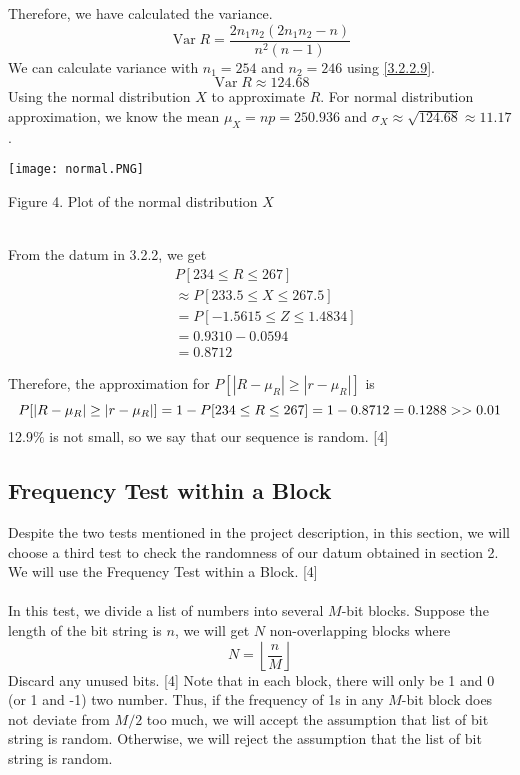 \documentclass[a4paper,12pt]{article}
\begin{document}
Therefore, we have calculated the variance.\\
\begin{equation}\label{3.2.2.9}
\operatorname { Var }  R=\frac { 2 n_1 n_2 ( 2n_1 n_2 - n ) } {  n  ^ { 2 } ( n - 1 ) }
\end{equation}
We can calculate variance with $n_1=254$ and $n_2=246$ using \eqref{3.2.2.9}.\\
\begin{equation*}
\operatorname{Var}  R\approx124.68
\end{equation*}
Using the normal distribution $X$ to approximate $R$. For normal distribution approximation, we know the mean $\mu_X=np=250.936$ and $\sigma_X\approx\sqrt{124.68}\approx11.17$.\\

\centerline{\texttt{[image: normal.PNG]}}

\centerline{Figure 4. Plot of the normal distribution $X$}

\noindent \\ From the datum in 3.2.2, we get
\begin{equation*}
\begin{aligned}
&P[234\leq R \leq 267]\\
& \approx P[233.5 \leq X \leq 267.5]\\
&=P[-1.5615 \leq Z \leq1.4834]\\
&=0.9310-0.0594\\
&=0.8712
\end{aligned}
\end{equation*}

Therefore, the approximation for $P[|R-\mu _R|\geq |r-\mu_R|]$ is
\begin{equation*}
P[|R-\mu _R|\geq |r-\mu_R|]=1-P[234\leq R\leq 267] =1-0.8712=0.1288>>0.01\\
\end{equation*}
12.9$\%$ is not small, so we say that our sequence is random. [4] 
\subsection{Frequency Test within a Block}
\noindent Despite the two tests mentioned in the project description, in this section, we will choose a third test to check the randomness of our datum obtained in section 2. We will use the Frequency Test within a Block. [4] \\\\
In this test, we divide a list of numbers into several $M$-bit blocks. Suppose the length of the bit string is $n$, we will get $N$ non-overlapping blocks where
$$N=\left\lfloor\frac{n}{M}\right\rfloor$$
Discard any unused bits. [4] Note that in each block, there will only be 1 and 0 (or 1 and -1) two number. Thus, if the frequency of 1s in any $M$-bit block does not deviate from $M/2$ too much, we will accept the assumption that list of bit string is random. Otherwise, we will reject the assumption that the list of bit string is random.
\end{document}
